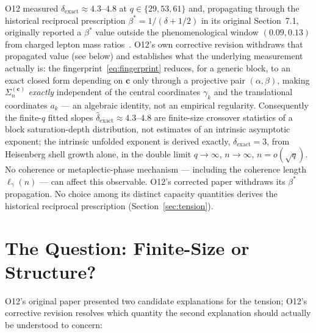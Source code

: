 \documentclass[11pt,a4paper]{article}
\theoremstyle{plain}
\theoremstyle{definition}
\newcommand{\dhat}{\hat\delta_{\mathrm{exact}}}
\newcommand{\bstar}{\beta^*}
\begin{document}
  O12 measured $\dhat \approx 4.3$--$4.8$ at $q \in \{29, 53, 61\}$ and, propagating
  through the historical reciprocal prescription $\bstar = 1/(\delta + 1/2)$
  in its original Section~7.1, originally reported a $\bstar$ value outside the
  phenomenological window $(0.09, 0.13)$ from charged lepton mass
  ratios~\cite{Beau2026a7}.
  O12's own corrective revision withdraws that propagated value (see below) and
  establishes what the underlying measurement actually is:
  the fingerprint~\eqref{eq:fingerprint} reduces, for a generic block, to an exact
  closed form depending on $\mathbf{c}$ only through a projective pair
  $(\alpha,\beta)$, making $\Sigma_n^{(\mathbf{c})}$ \emph{exactly} independent of
  the central coordinates $\gamma_k$ and the translational coordinates $a_k$ — an
  algebraic identity, not an empirical regularity.
  Consequently the finite-$q$ fitted slopes $\dhat\approx4.3$--$4.8$ are finite-size
  crossover statistics of a block saturation-depth distribution, not estimates of an
  intrinsic asymptotic exponent; the intrinsic unfolded exponent is derived exactly,
  $\delta_{\mathrm{exact}}=3$, from Heisenberg shell growth alone, in the double limit
  $q\to\infty$, $n\to\infty$, $n=o(\sqrt q)$.
  No coherence or metaplectic-phase mechanism — including the coherence length
  $\ell_\gamma(n)$ — can affect this observable.
  O12's corrected paper withdraws its $\bstar$ propagation.
  No choice among its distinct capacity quantities derives the historical
  reciprocal prescription (Section~\ref{sec:tension}).

  \section{The Question: Finite-Size or Structure?}
  \label{sec:question}

  O12's original paper presented two candidate explanations for the tension;
  O12's corrective revision resolves which quantity the second explanation should
  actually be understood to concern:
\end{document}
